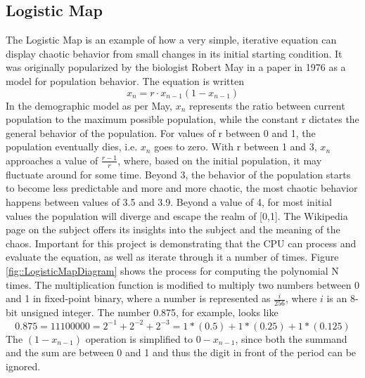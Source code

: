 \subsection{Logistic Map} \label{ssec:LogisticMap}
The Logistic Map \cite{LogMap_Wiki} is an example of how a very simple, iterative equation can display chaotic behavior from small changes in its initial starting condition. It was originally popularized by the biologist Robert May in a paper in 1976 as a model for population behavior. The equation is written
\[x_n = r \cdot x_{n-1} (1-x_{n-1})\]
In the demographic model as per May, $x_n$ represents the ratio between current population to the maximum possible population, while the constant r dictates the general behavior of the population. For values of r between 0 and 1, the population eventually dies, i.e. $x_n$ goes to zero. With r between 1 and 3, $x_n$ approaches a value of $\frac{r-1}{r}$, where, based on the initial population, it may fluctuate around for some time. Beyond 3, the behavior of the population starts to become less predictable and more and more chaotic, the most chaotic behavior happens between values of 3.5 and 3.9. Beyond a value of 4, for most initial values the population will diverge and escape the realm of [0,1]. The Wikipedia page on the subject offers its insights into the subject and the meaning of the chaos. Important for this project is demonstrating that the CPU can process and evaluate the equation, as well as iterate through it a number of times. Figure \ref{fig::LogisticMapDiagram} shows the process for computing the polynomial N times. The multiplication function is modified to multiply two numbers between 0 and 1 in fixed-point binary, where a number is represented as $\frac{i}{256}$, where $i$ is an 8-bit unsigned integer. The number 0.875, for example, looks like
\[0.875 = 11100000 = 2^{-1} + 2^{-2} + 2^{-3} = 1 * (0.5) + 1 * (0.25) + 1 * (0.125)\]
The $(1-x_{n-1})$ operation is simplified to $0-x_{n-1}$, since both the summand and the sum are between 0 and 1 and thus the digit in front of the period can be ignored.

